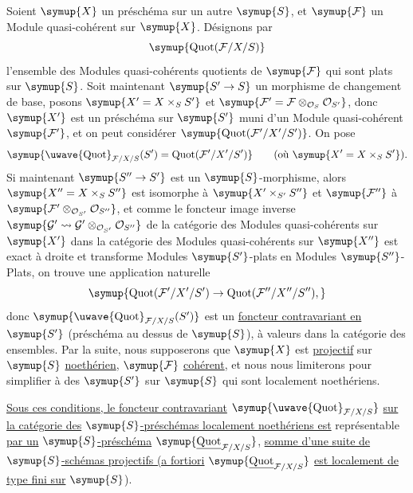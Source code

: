 Soient $\symup{X}$ un préschéma sur un autre $\symup{S}$, et $\symup{\mathcal F}$ un Module
quasi-cohérent sur $\symup{X}$. Désignons par
\[
\symup{\operatorname{Quot}(\mathcal F/X/S)}
\]
l'ensemble des Modules quasi-cohérents quotients de $\symup{\mathcal F}$ qui sont plats
sur $\symup{S}$. Soit maintenant $\symup{S'\to S}$ un morphisme de changement de
base, posons $\symup{X'=X\times_S S'}$ et
$\symup{\mathcal F'=\mathcal F\otimes_{\mathcal O_S}\mathcal O_{S'}}$, donc $\symup{X'}$ est
un préschéma sur $\symup{S'}$ muni d'un Module
quasi-cohérent $\symup{\mathcal F'}$, et on peut considérer
$\symup{\operatorname{Quot}(\mathcal F'/X'/S')}$. On pose
\[
\symup{\mathop{\text{\uwave{Quot}}}\nolimits_{\mathcal F/X/S}(S')
=\operatorname{Quot}(\mathcal F'/X'/S')}
\qquad\text{(où $\symup{X'=X\times_SS'}$)}.
\]
Si maintenant $\symup{S''\to S'}$ est un $\symup{S}$-morphisme, alors
$\symup{X''=X\times_SS''}$ est isomorphe à $\symup{X'\times_{S'}S''}$ et $\symup{\mathcal F''}$ à
$\symup{\mathcal F'\otimes_{\mathcal O_{S'}}\mathcal O_{S''}}$, et comme le foncteur
image inverse
$\symup{\mathcal G'\rightsquigarrow\mathcal G'\otimes_{\mathcal O_{S'}}\mathcal O_{S''}}$
de la catégorie des Modules quasi-cohérents sur $\symup{X'}$ dans la catégorie des
Modules quasi-cohérents sur $\symup{X''}$ est exact à droite et transforme Modules
$\symup{S'}$-plats en Modules $\symup{S''}$-Plats, on trouve une application naturelle
\[
\symup{\operatorname{Quot}(\mathcal F'/X'/S')\to
\operatorname{Quot}(\mathcal F''/X''/S''),}
\]
donc $\symup{\mathop{\text{\uwave{Quot}}}\nolimits_{\mathcal F/X/S}(S')}$ est un \uline{foncteur
contravariant en} $\symup{S'}$ (préschéma au dessus de $\symup{S}$), à valeurs dans la catégorie
des ensembles. Par la suite, nous supposerons que $\symup{X}$ est \uline{projectif} sur $\symup{S}$
\uline{noethérien}, $\symup{\mathcal F}$ \uline{cohérent}, et nous nous limiterons pour simplifier à
des $\symup{S'}$ sur $\symup{S}$ qui sont localement noethériens.

 \uline{Sous ces conditions, le foncteur contravariant}
$\symup{\mathop{\text{\uwave{Quot}}}\nolimits_{\mathcal F/X/S}}$ \uline{sur la catégorie des}
$\symup{S}$\uline{-préschémas localement noethériens est} représentable \uline{par un} $\symup{S}$\uline{-préschéma}
$\symup{\underline{\operatorname{Quot}}_{\mathcal F/X/S}}$, \uline{somme d'une suite de} $\symup{S}$\uline{-schémas
projectifs (a fortiori} $\symup{\underline{\operatorname{Quot}}_{\mathcal F/X/S}}$ \uline{est localement de
type fini sur} $\symup{S}$).


